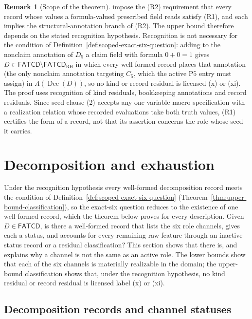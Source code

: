 \documentclass[11pt]{article}
\theoremstyle{definition}
\newtheorem{remark}[theorem]{Remark}
\newcommand{\FATCD}{\ensuremath{\mathsf{FATCD}}}
\newcommand{\Dec}[1]{\ensuremath{\operatorname{Dec}\!\left(#1\right)}}
\newcommand{\Pfive}{\ensuremath{\mathrm{P5}}}
\begin{document}
\begin{remark}[Scope of the theorem]
impose the (R2) requirement that every record whose values a formula-valued prescribed field reads satisfy (R1), and each implies the structural-annotation branch of
(R2). The upper bound therefore depends on the stated
recognition hypothesis. Recognition is not necessary for the condition of Definition~\ref{def:scoped-exact-six-question}: adding to the nonclaim annotation of \(D_5\) a claim field with formula \(0+0=1\) gives \(D\in\FATCD{}\setminus\FATCD_{\mathrm{RH}}\) in which every well-formed record places that annotation (the only nonclaim annotation targeting \(C_5\), which the active \Pfive{} entry must assign) in \(A(\Dec{D})\), so no kind or record residual is licensed (x) or (xi). The proof uses recognition of kind residuals, bookkeeping annotations and record residuals. Since seed clause (2) accepts any one-variable
macro-specification with a realization relation whose recorded evaluations take both truth values, (R1)
certifies the form of a record, not that its assertion concerns the role
whose seed it carries.
\end{remark}
 \section{Decomposition and exhaustion}\label{sec:decomposition-exhaustion}



Under the recognition hypothesis every well-formed decomposition record meets
the condition of Definition~\ref{def:scoped-exact-six-question}
(Theorem~\ref{thm:upper-bound-classification}), so the exact-six question
reduces to the existence of one well-formed record, which the theorem below
proves for every description. Given \(D \in \FATCD{}\), is there a
well-formed record that lists the six role channels, gives each a
status, and accounts for every remaining raw feature through an
inactive status record or a residual classification? This section shows that there is, and explains why a
channel is not the same as an active role. The lower bounds show that each
of the six channels is materially realizable in the domain; the
upper-bound classification shows that, under the recognition hypothesis, no
kind residual or record residual is licensed label (x) or (xi).

\subsection{Decomposition records and channel statuses}\label{subsec:dec-records}
\end{document}
